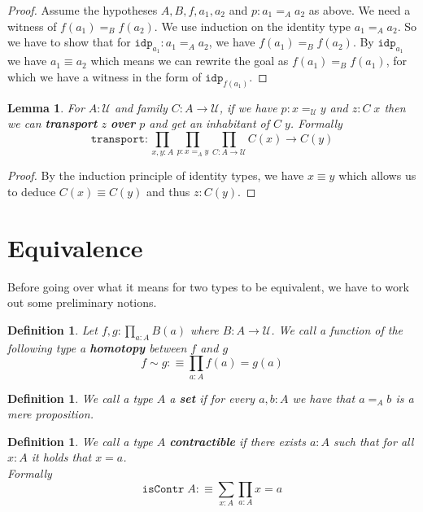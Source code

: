 \documentclass[12pt]{report}
\newtheorem{lem}[thm]{Lemma}
\newtheorem{defn}[thm]{Definition}
\theoremstyle{definition}
\begin{document}
	\begin{proof}
	Assume the hypotheses $A,B,f, a_1, a_2$ and $p : a_1 =_A a_2$ as above. 
	We need a witness of $f(a_1) =_B f(a_2)$. 
	We use induction on the identity type $a_1 =_A a_2$. 
	So we have to show that for $\mathtt{idp}_{a_1} : a_1 =_A a_2$, we have $f(a_1) =_B f(a_2)$. 
	By $\mathtt{idp}_{a_1}$ we have $a_1 \equiv a_2$ which means we can rewrite the goal as $f(a_1) =_B f(a_1)$, for which we have a witness in the form of $\mathtt{idp}_{f(a_1)}$. 
	\end{proof}
	\begin{lem}
	For $A: \mathcal{U}$ and family $C : A \rightarrow \mathcal{U}$, if we have $ p : x =_\mathcal{U} y$ and $z : C\;x$  then we can \textbf{transport} $z$ \textbf{over} $p$ and get an inhabitant of $C\;y$. 
	Formally
	$$\mathtt{transport} : \prod_{x,y : A}\prod_{p : x =_A y}\prod_{C : A \rightarrow \mathcal{U}}C(x) \rightarrow C(y)$$
	\end{lem}
	\begin{proof}
	By the induction principle of identity types, we have $x \equiv y$ which allows us to deduce $C(x) \equiv C(y)$ and thus $z : C(y)$. 
	\end{proof}

\section{Equivalence}
	Before going over what it means for two types to be equivalent, we have to work out some preliminary notions. 
	\begin{defn}
	Let $f,g : \prod_{a:A}B(a)$ where $B :A \rightarrow \mathcal{U}$. 
	We call a function of the following type a \textbf{homotopy} between $f$ and $g$
	$$f\sim g :\equiv \prod_{a:A}f(a) = g(a)$$
	\end{defn}

	\begin{defn}
	We call a type $A$ a \textbf{set} if for every $a,b : A$ we have that $a =_A b$ is a mere proposition.
	\end{defn}

	\begin{defn}
	We call a type $A$ \textbf{contractible} if there exists $a : A$ such that for all $x : A$ it holds that $x = a$.\\
	Formally
	$$\mathtt{isContr}\; A :\equiv \sum_{x : A}\prod_{a :A}x=a$$
	\end{defn}
\end{document}

